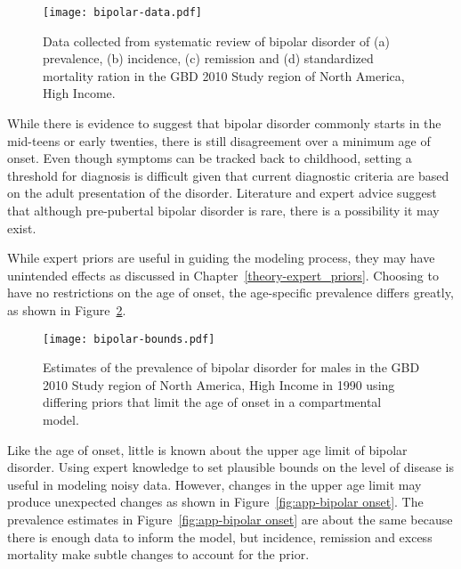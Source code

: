     \begin{figure}[h]
        \begin{center}
            \texttt{[image: bipolar-data.pdf]}
            \caption{Data collected from systematic review of bipolar
              disorder of (a) prevalence, (b) incidence, (c) remission and
              (d) standardized mortality ration in the GBD 2010 Study
              region of North America, High Income.}
            \label{fig:app-bipolar data}
        \end{center}
    \end{figure}

While there is evidence to suggest that bipolar disorder commonly
starts in the mid-teens or early twenties, there is still disagreement
over a minimum age of onset.  Even though symptoms can be tracked back
to childhood, setting a threshold for diagnosis is difficult given
that current diagnostic criteria are based on the adult presentation of
the disorder.  Literature and expert advice suggest that although
pre-pubertal bipolar disorder is rare, there is a possibility it may
exist. \cite{kloos_bipolar_2011, angst_historical_2000}

While expert priors are useful in guiding the modeling process, they
may have unintended effects as discussed in Chapter~\ref{theory-expert_priors}.
Choosing to have no restrictions on the
age of onset, the age-specific prevalence differs greatly, as shown in
Figure~\ref{fig:app-bipolar bounds}.

    \begin{figure}[h]
        \begin{center}
            \texttt{[image: bipolar-bounds.pdf]}
            \caption{Estimates of the prevalence of bipolar disorder
              for males in the GBD 2010 Study region of North America, High Income
              in 1990 using differing priors that limit the age of onset
              in a compartmental model.}
            \label{fig:app-bipolar bounds}
        \end{center}
    \end{figure}

Like the age of onset, little is known about the upper age limit of
bipolar disorder.  Using expert knowledge to set plausible bounds on the
level of disease is useful in modeling noisy data.  However, changes in the upper age
limit may produce unexpected changes as shown in Figure~\ref{fig:app-bipolar onset}.
The prevalence estimates in Figure~\ref{fig:app-bipolar onset} are about
the same because there is enough data to inform the model, but incidence,
remission and excess mortality make subtle changes to account for the prior.

